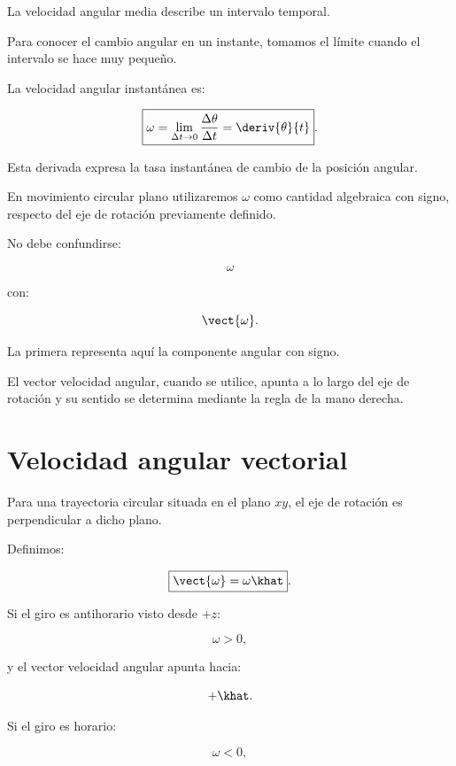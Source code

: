 La velocidad angular media describe un intervalo temporal.

Para conocer el cambio angular en un instante, tomamos el límite cuando el
intervalo se hace muy pequeño.

\begin{definicion}

La velocidad angular instantánea es:

\[
\boxed{
\omega
=
\lim_{\Delta t\to0}
\frac{\Delta\theta}{\Delta t}
=
\deriv{\theta}{t}
}.
\]

\end{definicion}

Esta derivada expresa la tasa instantánea de cambio de la posición angular.

En movimiento circular plano utilizaremos \(\omega\) como cantidad algebraica
con signo, respecto del eje de rotación previamente definido.

\begin{advertencia}

No debe confundirse:

\[
\omega
\]

con:

\[
\vect{\omega}.
\]

La primera representa aquí la componente angular con signo.

El vector velocidad angular, cuando se utilice, apunta a lo largo del eje de
rotación y su sentido se determina mediante la regla de la mano derecha.

\end{advertencia}


\section{Velocidad angular vectorial}

Para una trayectoria circular situada en el plano \(xy\), el eje de rotación
es perpendicular a dicho plano.

Definimos:

\[
\boxed{
\vect{\omega}
=
\omega\khat
}.
\]

Si el giro es antihorario visto desde \(+z\):

\[
\omega>0,
\]

y el vector velocidad angular apunta hacia:

\[
+\khat.
\]

Si el giro es horario:

\[
\omega<0,
\]

